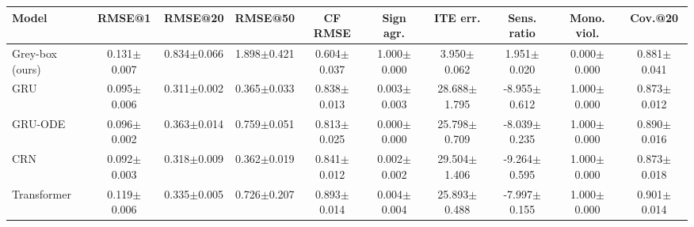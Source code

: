 \begin{tabular}{lccccccccc}
\toprule
Model & RMSE@1 & RMSE@20 & RMSE@50 & CF RMSE & Sign agr. & ITE err. & Sens. ratio & Mono. viol. & Cov.@20 \\
\midrule
Grey-box (ours) & 0.131$\pm$0.007 & 0.834$\pm$0.066 & 1.898$\pm$0.421 & 0.604$\pm$0.037 & 1.000$\pm$0.000 & 3.950$\pm$0.062 & 1.951$\pm$0.020 & 0.000$\pm$0.000 & 0.881$\pm$0.041 \\
GRU & 0.095$\pm$0.006 & 0.311$\pm$0.002 & 0.365$\pm$0.033 & 0.838$\pm$0.013 & 0.003$\pm$0.003 & 28.688$\pm$1.795 & -8.955$\pm$0.612 & 1.000$\pm$0.000 & 0.873$\pm$0.012 \\
GRU-ODE & 0.096$\pm$0.002 & 0.363$\pm$0.014 & 0.759$\pm$0.051 & 0.813$\pm$0.025 & 0.000$\pm$0.000 & 25.798$\pm$0.709 & -8.039$\pm$0.235 & 1.000$\pm$0.000 & 0.890$\pm$0.016 \\
CRN & 0.092$\pm$0.003 & 0.318$\pm$0.009 & 0.362$\pm$0.019 & 0.841$\pm$0.012 & 0.002$\pm$0.002 & 29.504$\pm$1.406 & -9.264$\pm$0.595 & 1.000$\pm$0.000 & 0.873$\pm$0.018 \\
Transformer & 0.119$\pm$0.006 & 0.335$\pm$0.005 & 0.726$\pm$0.207 & 0.893$\pm$0.014 & 0.004$\pm$0.004 & 25.893$\pm$0.488 & -7.997$\pm$0.155 & 1.000$\pm$0.000 & 0.901$\pm$0.014 \\
\bottomrule
\end{tabular}

